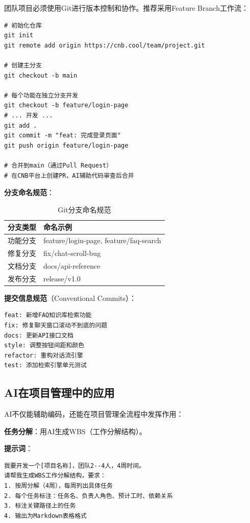 团队项目必须使用Git进行版本控制和协作。推荐采用Feature Branch工作流：

\begin{lstlisting}[style=shell]
# 初始化仓库
git init
git remote add origin https://cnb.cool/team/project.git

# 创建主分支
git checkout -b main

# 每个功能在独立分支开发
git checkout -b feature/login-page
# ... 开发 ...
git add .
git commit -m "feat: 完成登录页面"
git push origin feature/login-page

# 合并到main（通过Pull Request）
# 在CNB平台上创建PR，AI辅助代码审查后合并
\end{lstlisting}

\textbf{分支命名规范}：

\begin{table}[H]
\centering
\begin{tabular}{ll}
\toprule
\textbf{分支类型} & \textbf{命名示例} \\
\midrule
功能分支 & feature/login-page, feature/faq-search \\
修复分支 & fix/chat-scroll-bug \\
文档分支 & docs/api-reference \\
发布分支 & release/v1.0 \\
\bottomrule
\end{tabular}
\caption{Git分支命名规范}
\end{table}

\textbf{提交信息规范}（Conventional Commits）：

\begin{lstlisting}
feat: 新增FAQ知识库检索功能
fix: 修复聊天窗口滚动不到底的问题
docs: 更新API接口文档
style: 调整按钮间距和颜色
refactor: 重构对话流引擎
test: 添加检索引擎单元测试
\end{lstlisting}

\subsection{AI在项目管理中的应用}

AI不仅能辅助编码，还能在项目管理全流程中发挥作用：

\textbf{任务分解}：用AI生成WBS（工作分解结构）。

\begin{practicebox}[用AI生成项目WBS]
\textbf{提示词}：

\begin{lstlisting}
我要开发一个[项目名称]，团队2--4人，4周时间。
请帮我生成WBS工作分解结构，要求：
1. 按周分解（4周），每周列出具体任务
2. 每个任务标注：任务名、负责人角色、预计工时、依赖关系
3. 标注关键路径上的任务
4. 输出为Markdown表格格式
\end{lstlisting}
\end{practicebox}

